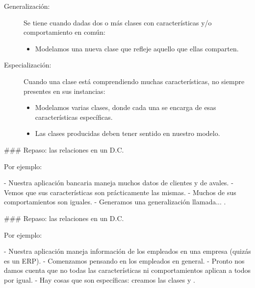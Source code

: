 \begin{description}
    \item[Generalización:] Se tiene cuando dadas dos o más clases con características y/o comportamiento en común:
    \begin{itemize}
        \item Modelamos una nueva clase que refleje aquello que ellas comparten.
    \end{itemize}
\vfill
    \item[Especialización:] Cuando una clase está comprendiendo muchas características, no siempre presentes en sus instancias:
    \begin{itemize}
        \item Modelamos varias clases, donde cada una se encarga de esas características específicas.
        \item Las clases producidas deben tener sentido en nuestro modelo.
    \end{itemize}
\end{description}

### Repaso: las relaciones en un D.C.


Por ejemplo:

- Nuestra aplicación bancaria maneja muchos datos de clientes y de avales.
    - Vemos que sus características son prácticamente las mismas.
    - Muchos de sus comportamientos son iguales.
    - Generamos una generalización llamada... .

\centering{}

### Repaso: las relaciones en un D.C.


Por ejemplo:

- Nuestra aplicación maneja información de los empleados en una empresa (quizás es un ERP).
    - Comenzamos pensando en los empleados en general.
    - Pronto nos damos cuenta que no todas las características ni comportamientos aplican
    a todos por igual.
    - Hay cosas que son específicas: creamos las clases  y .

